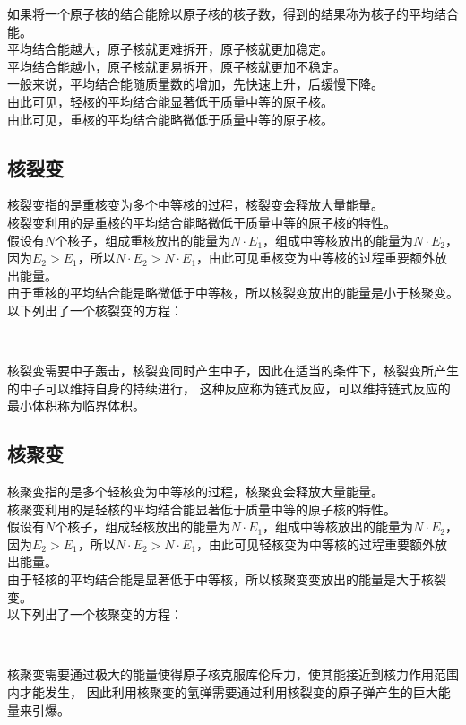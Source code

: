 \documentclass[UTF8]{ctexart}
\begin{document}
\newpage

    如果将一个原子核的结合能除以原子核的核子数，得到的结果称为核子的平均结合能。\\[3mm]
    平均结合能越大，原子核就更难拆开，原子核就更加稳定。\\[3mm]
    平均结合能越小，原子核就更易拆开，原子核就更加不稳定。\\[6mm]
    一般来说，平均结合能随质量数的增加，先快速上升，后缓慢下降。\\[3mm]
    由此可见，轻核的平均结合能显著低于质量中等的原子核。\\[3mm]
    由此可见，重核的平均结合能略微低于质量中等的原子核。

\subsection{核裂变}
    核裂变指的是重核变为多个中等核的过程，核裂变会释放大量能量。\\[3mm]
    核裂变利用的是重核的平均结合能略微低于质量中等的原子核的特性。\\[3mm]
    假设有$N$个核子，组成重核放出的能量为$N\cdot E_1$，组成中等核放出的能量为$N\cdot E_2$，
    因为$E_2>E_1$，所以$N\cdot E_2>N\cdot E_1$，由此可见重核变为中等核的过程重要额外放出能量。\\[3mm]
    由于重核的平均结合能是略微低于中等核，所以核裂变放出的能量是小于核聚变。\\[5mm]
    以下列出了一个核裂变的方程：
    \begin{center}
        \\[6mm]
    \end{center}
    核裂变需要中子轰击，核裂变同时产生中子，因此在适当的条件下，核裂变所产生的中子可以维持自身的持续进行，
    这种反应称为链式反应，可以维持链式反应的最小体积称为临界体积。

\subsection{核聚变}
    核聚变指的是多个轻核变为中等核的过程，核聚变会释放大量能量。\\[3mm]
    核聚变利用的是轻核的平均结合能显著低于质量中等的原子核的特性。\\[3mm]
    假设有$N$个核子，组成轻核放出的能量为$N\cdot E_1$，组成中等核放出的能量为$N\cdot E_2$，
    因为$E_2>E_1$，所以$N\cdot E_2>N\cdot E_1$，由此可见轻核变为中等核的过程重要额外放出能量。\\[3mm]
    由于轻核的平均结合能是显著低于中等核，所以核聚变变放出的能量是大于核裂变。\\[5mm]
    以下列出了一个核聚变的方程：
    \begin{center}
        \\[6mm]
    \end{center}
    核聚变需要通过极大的能量使得原子核克服库伦斥力，使其能接近到核力作用范围内才能发生，
    因此利用核聚变的氢弹需要通过利用核裂变的原子弹产生的巨大能量来引爆。
\end{document}
